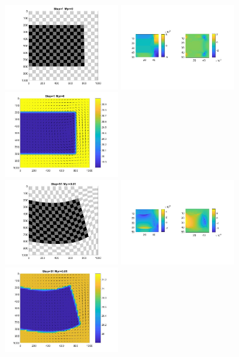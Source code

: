 \begin{center}
\includegraphics[width=5cm]{python_codes/fieldstone_64/results/slab/gerya2/markers_0000_Myr}
\includegraphics[width=5cm]{python_codes/fieldstone_64/results/slab/gerya2/stress_0000_Myr}
\includegraphics[width=5cm]{python_codes/fieldstone_64/results/slab/gerya2/velocity_0000_Myr}\\
\includegraphics[width=5cm]{python_codes/fieldstone_64/results/slab/gerya2/markers_0010_Myr}
\includegraphics[width=5cm]{python_codes/fieldstone_64/results/slab/gerya2/stress_0010_Myr}
\includegraphics[width=5cm]{python_codes/fieldstone_64/results/slab/gerya2/velocity_0010_Myr}\\

\end{center}
